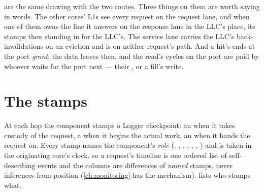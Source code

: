 

 are the same drawing with the two routes. Three things
on them are worth saying in words. The other cores' L1s see every request on the request lane,
and when one of them owns the line it answers on the response lane in the LLC's place, its
stamps then standing in for the LLC's. The service lane carries the LLC's back-invalidations on
an eviction and is on neither request's path. And a hit's  ends at the port
\emph{grant}: the data leaves then, and the read's  cycles on the port are paid by
whoever waits for the port next --- their , or a fill's write.

\section{The stamps}

At each hop the component stamps a Logger checkpoint: an  when it takes custody of
the request, a  when it begins the actual work, an  when it hands the
request on. Every stamp names the component's \emph{role} (, ,
, , , , ) and is taken in the
originating core's clock, so a request's timeline is one ordered list of self-describing events
and the columns are differences of \emph{named} stamps, never inferences from position
(\cref{ch:monitoring} has the mechanism).  lists who stamps what.

